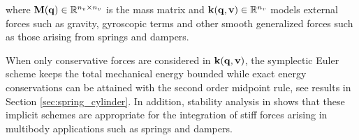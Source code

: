 where ${\mathbf{M}}({\mathbf{q}})\in\mathbb{R}^{n_v\times n_v}$ is the mass matrix and
${\mathbf{k}}({\mathbf{q}},{\mathbf{v}})\in\mathbb{R}^{n_v}$ models external forces such as
gravity, gyroscopic terms and other smooth generalized forces such as those
arising from springs and dampers.


When only conservative forces are considered in
${\mathbf{k}}({\mathbf{q}},{\mathbf{v}})$, the symplectic Euler scheme keeps the total mechanical
energy bounded while exact energy conservations can be attained with the second
order midpoint rule, see results in Section \ref{sec:spring_cylinder}. In
addition, stability analysis in \cite{bib:anitescu2002,bib:potra2006linearly}
shows that these implicit schemes are appropriate for the integration of stiff
forces arising in multibody applications such as springs and dampers.
